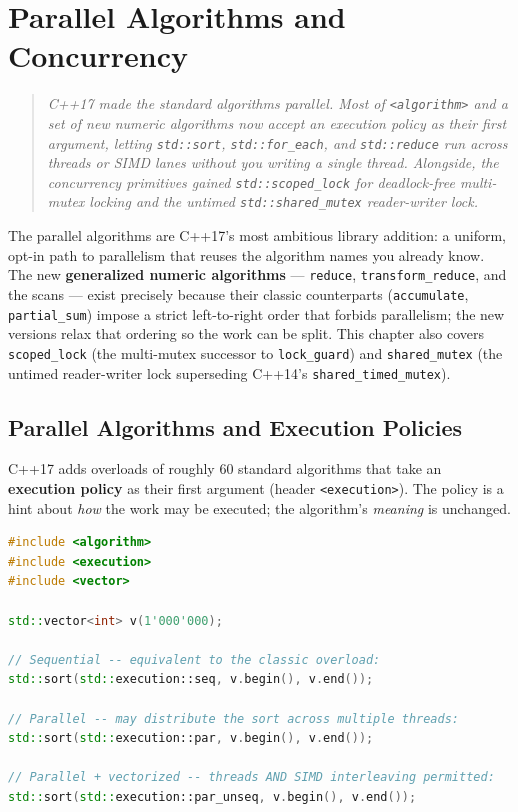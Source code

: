 \chapter{Parallel Algorithms and Concurrency}
\label{ch:c17-parallel-concurrency}

\begin{quote}
\emph{C++17 made the standard algorithms parallel. Most of \texttt{<algorithm>} and a set of new numeric algorithms now accept an execution policy as their first argument, letting \texttt{std::sort}, \texttt{std::for\_each}, and \texttt{std::reduce} run across threads or SIMD lanes without you writing a single thread. Alongside, the concurrency primitives gained \texttt{std::scoped\_lock} for deadlock-free multi-mutex locking and the untimed \texttt{std::shared\_mutex} reader-writer lock.}
\end{quote}

The parallel algorithms are C++17's most ambitious library addition: a uniform, opt-in path to parallelism that reuses the algorithm names you already know. The new \textbf{generalized numeric algorithms} --- \texttt{reduce}, \texttt{transform\_reduce}, and the scans --- exist precisely because their classic counterparts (\texttt{accumulate}, \texttt{partial\_sum}) impose a strict left-to-right order that forbids parallelism; the new versions relax that ordering so the work can be split. This chapter also covers \texttt{scoped\_lock} (the multi-mutex successor to \texttt{lock\_guard}) and \texttt{shared\_mutex} (the untimed reader-writer lock superseding C++14's \texttt{shared\_timed\_mutex}).

\section{Parallel Algorithms and Execution Policies}
\label{sec:c17-exec-policies-intro}

C++17 adds overloads of roughly 60 standard algorithms that take an \textbf{execution policy} as their first argument (header \texttt{<execution>}). The policy is a hint about \emph{how} the work may be executed; the algorithm's \emph{meaning} is unchanged.

\begin{lstlisting}[language=C++,caption={The same sort, three execution strategies}]
#include <algorithm>
#include <execution>
#include <vector>

std::vector<int> v(1'000'000);

// Sequential -- equivalent to the classic overload:
std::sort(std::execution::seq, v.begin(), v.end());

// Parallel -- may distribute the sort across multiple threads:
std::sort(std::execution::par, v.begin(), v.end());

// Parallel + vectorized -- threads AND SIMD interleaving permitted:
std::sort(std::execution::par_unseq, v.begin(), v.end());
\end{lstlisting}

